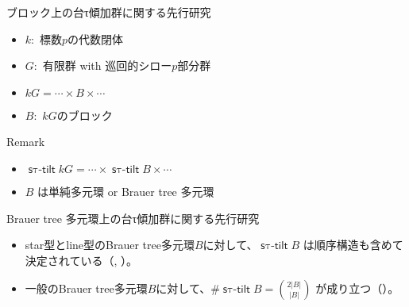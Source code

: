 \documentclass[dvipdfmx,10pt,handout
]{beamer}
\newcommand{\stautilt}{\operatorname{\mathsf{s\tau-tilt}}}
\begin{document}
\begin{frame}{ブロック上の台τ傾加群に関する先行研究}
    \begin{itemize}
        \item \(k:\) 標数\(p\)の代数閉体
        \item \(G:\) 有限群 \pause\alert<5>{with 巡回的シロー\(p\)部分群}\pause
        \item \(kG=\cdots \times B \times \cdots\)
        \item \(B:\) \(kG\)のブロック
    \end{itemize}
    \pause
    \begin{alertblock}{Remark}
        \begin{itemize}
            \item \(\stautilt kG=\cdots \times \stautilt B \times \cdots\)\pause
            \item \alert<5>{\(B\) は単純多元環 or Brauer tree 多元環}
        \end{itemize}
    \end{alertblock}
    \pause
    \begin{block}
        {Brauer tree 多元環上の台τ傾加群に関する先行研究}
        \begin{itemize}
            \item star型とline型のBrauer tree多元環\(B\)に対して、\(\stautilt B\) は順序構造も含めて決定されている（\cite{MR3461065}, \cite{aoki2019classifying}）。\pause
            \item 一般のBrauer tree多元環\(B\)に対して、\(\#\stautilt B=\binom{2|B|}{|B|}\) が成り立つ（\cite{ASASHIBA2020119}）。
        \end{itemize}
    \end{block}
\end{frame}
\end{document}
